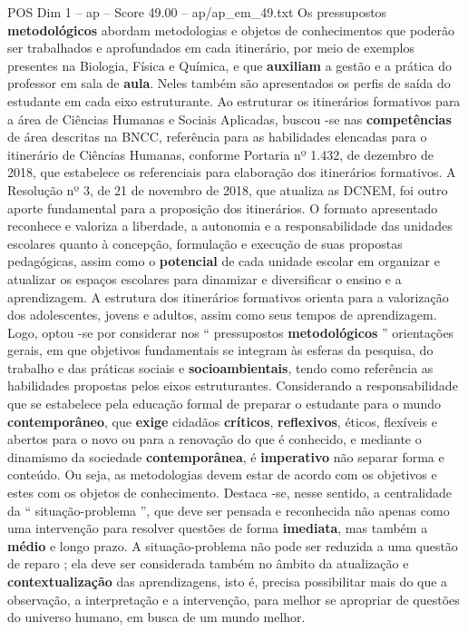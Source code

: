 \begin{textsample}{POS Dim 1 – ap – Score 49.00 – ap/ap\_em\_49.txt}
Os pressupostos \textbf{metodológicos} abordam metodologias e objetos de conhecimentos que poderão ser trabalhados e aprofundados em cada itinerário, por meio de exemplos presentes na Biologia, Física e Química, e que \textbf{auxiliam} a gestão e a prática do professor em sala de \textbf{aula}.
Neles também são apresentados os perfis de saída do estudante em cada eixo estruturante.
Ao estruturar os itinerários formativos para a área de Ciências Humanas e Sociais Aplicadas, buscou -se nas \textbf{competências} de área descritas na BNCC, referência para as habilidades elencadas para o itinerário de Ciências Humanas, conforme Portaria nº 1.432, de dezembro de 2018, que estabelece os referenciais para elaboração dos itinerários formativos.
A Resolução nº 3, de 21 de novembro de 2018, que atualiza as DCNEM, foi outro aporte fundamental para a proposição dos itinerários.
O formato apresentado reconhece e valoriza a liberdade, a autonomia e a responsabilidade das unidades escolares quanto à concepção, formulação e execução de suas propostas pedagógicas, assim como o \textbf{potencial} de cada unidade escolar em organizar e atualizar os espaços escolares para dinamizar e diversificar o ensino e a aprendizagem.
A estrutura dos itinerários formativos orienta para a valorização dos adolescentes, jovens e adultos, assim como seus tempos de aprendizagem.
Logo, optou -se por considerar nos “ pressupostos \textbf{metodológicos} ” orientações gerais, em que objetivos fundamentais se integram às esferas da pesquisa, do trabalho e das práticas sociais e \textbf{socioambientais}, tendo como referência as habilidades propostas pelos eixos estruturantes.
Considerando a responsabilidade que se estabelece pela educação formal de preparar o estudante para o mundo \textbf{contemporâneo}, que \textbf{exige} cidadãos \textbf{críticos}, \textbf{reflexivos}, éticos, flexíveis e abertos para o novo ou para a renovação do que é conhecido, e mediante o dinamismo da sociedade \textbf{contemporânea}, é \textbf{imperativo} não separar forma e conteúdo.
Ou seja, as metodologias devem estar de acordo com os objetivos e estes com os objetos de conhecimento.
Destaca -se, nesse sentido, a centralidade da “ situação-problema ”, que deve ser pensada e reconhecida não apenas como uma intervenção para resolver questões de forma \textbf{imediata}, mas também a \textbf{médio} e longo prazo.
A situação-problema não pode ser reduzida a uma questão de reparo ; ela deve ser considerada também no âmbito da atualização e \textbf{contextualização} das aprendizagens, isto é, precisa possibilitar mais do que a observação, a interpretação e a intervenção, para melhor se apropriar de questões do universo humano, em busca de um mundo melhor.

\end{textsample}

